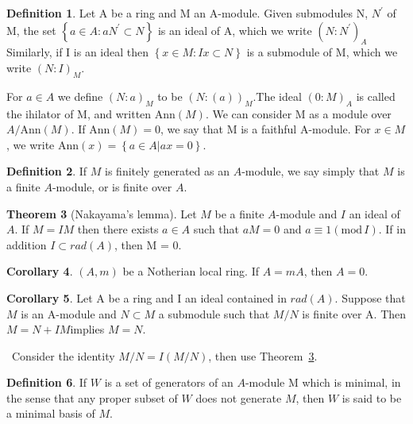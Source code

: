\documentclass[a4paper,12pt]{article}
\newenvironment{prooff}{{\noindent\it\textcolor{cyan!40!black}{Proof}:}\,}{\par}
\newcommand{\bbrace}[1]{\left\{ #1 \right\} }
\newcommand{\p}{^{\prime}}
\renewcommand{\mod}[1]{(\text{mod}\,#1)}
\theoremstyle{definition}
\newtheorem{defn}{Definition}[subsection]
\newtheorem{coro}[defn]{Corollary}
\newtheorem{theo}[defn]{Theorem}
\begin{document}
\begin{defn}
    Let A be a ring and M an A-module. Given submodules N, $N\p$
    of M, the set $\bbrace{a\in A:aN\p \subset  N}$ is an ideal of A, which we write $(N:N\p)_A$
    Similarly, if I is an ideal then $\bbrace{x\in M : Ix\subset N}$ is a
    submodule of M, which we write $(N:I)_M$.

    For $a\in A$ we define
    $(N:a)_M$ to be $(N:(a))_M$.The ideal $(0:M)_A$ is called the ihilator of M, and written
    $\text{Ann}(M)$. We can consider M as a module over $A/\text{Ann}(M)$. If $\text{Ann}(M) = 0$,
    we say that M is a faithful A-module. For $x\in M$, we write $\text{Ann}(x) =
        \bbrace{a\in A|ax=0}$.
\end{defn}
\begin{defn}
    If $M$ is finitely generated as an $A$-module, we say simply that $M$ is a
    finite $A$-module, or is finite over $A$.
\end{defn}
\begin{theo}[Nakayama’s lemma]
    Let $M$ be a finite $A$-module and $I$ an ideal of $A$. If
    $M = IM$ then there exists $a\in A$ such that $aM = 0$ and $a\equiv 1\mod{I}$. If in
    addition $I\subset rad(A)$, then M = 0.
    \label{theorem:Nakayama}
\end{theo}
\begin{coro}
    $(A,m)$ be a Notherian local ring. If $A=mA$, then $A=0$.
\end{coro}
\begin{coro}
    Let A be a ring and I an ideal contained in $rad(A)$. Suppose
    that $M$ is an A-module and $N \subset M$ a submodule such that $M/N$ is finite
    over A. Then $M=N+IM $implies $M=N$.
    \label{Corollary:Nakayama M=N+IM}
\end{coro}
\begin{prooff}
    Consider the identity $M/N=I(M/N)$, then use Theorem~\ref{theorem:Nakayama}.
\end{prooff}
\begin{defn}
    If $W$ is a set of generators of an $A$-module M which is minimal, in the
    sense that any proper subset of $W$ does not generate $M$, then $W$ is said
    to be a minimal basis of $M$.
\end{defn}
\end{document}
